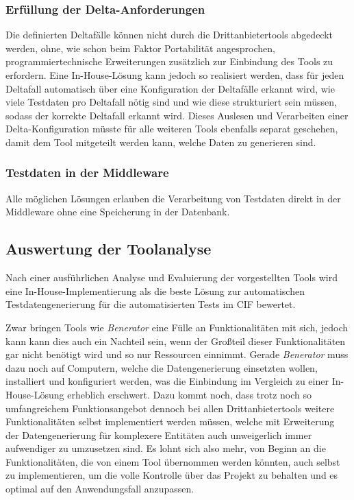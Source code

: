 \subsubsection*{Erfüllung der Delta-Anforderungen}
Die definierten Deltafälle können nicht durch die Drittanbietertools abgedeckt werden, ohne, wie schon beim Faktor Portabilität angesprochen, programmiertechnische Erweiterungen zusätzlich zur Einbindung des Tools zu erfordern. Eine In-House-Lösung kann jedoch so realisiert werden, dass für jeden Deltafall automatisch über eine Konfiguration der Deltafälle erkannt wird, wie viele Testdaten pro Deltafall nötig sind und wie diese strukturiert sein müssen, sodass der korrekte Deltafall erkannt wird. Dieses Auslesen und Verarbeiten einer Delta-Konfiguration müsste für alle weiteren Tools ebenfalls separat geschehen, damit dem Tool mitgeteilt werden kann, welche Daten zu generieren sind.

\subsubsection*{Testdaten in der Middleware}
Alle möglichen Lösungen erlauben die Verarbeitung von Testdaten direkt in der Middleware ohne eine Speicherung in der Datenbank.

\subsection{Auswertung der Toolanalyse}
Nach einer ausführlichen Analyse und Evaluierung der vorgestellten Tools wird eine In-House-Implementierung als die beste Lösung zur automatischen Testdatengenerierung für die automatisierten Tests im \ac{CIF} bewertet.

Zwar bringen Tools wie \textit{Benerator} eine Fülle an Funktionalitäten mit sich, jedoch kann kann dies auch ein Nachteil sein, wenn der Großteil dieser Funktionalitäten gar nicht benötigt wird und so nur Ressourcen einnimmt. Gerade \textit{Benerator} muss dazu noch auf Computern, welche die Datengenerierung einsetzten wollen, installiert und konfiguriert werden, was die Einbindung im Vergleich zu einer In-House-Lösung erheblich erschwert. Dazu kommt noch, dass trotz noch so umfangreichem Funktionsangebot dennoch bei allen Drittanbietertools weitere Funktionalitäten selbst implementiert werden müssen, welche mit Erweiterung der Datengenerierung für komplexere Entitäten auch unweigerlich immer aufwendiger zu umzusetzen sind. Es lohnt sich also mehr, von Beginn an die Funktionalitäten, die von einem Tool übernommen werden könnten, auch selbst zu implementieren, um die volle Kontrolle über das Projekt zu behalten und es optimal auf den Anwendungsfall anzupassen.

